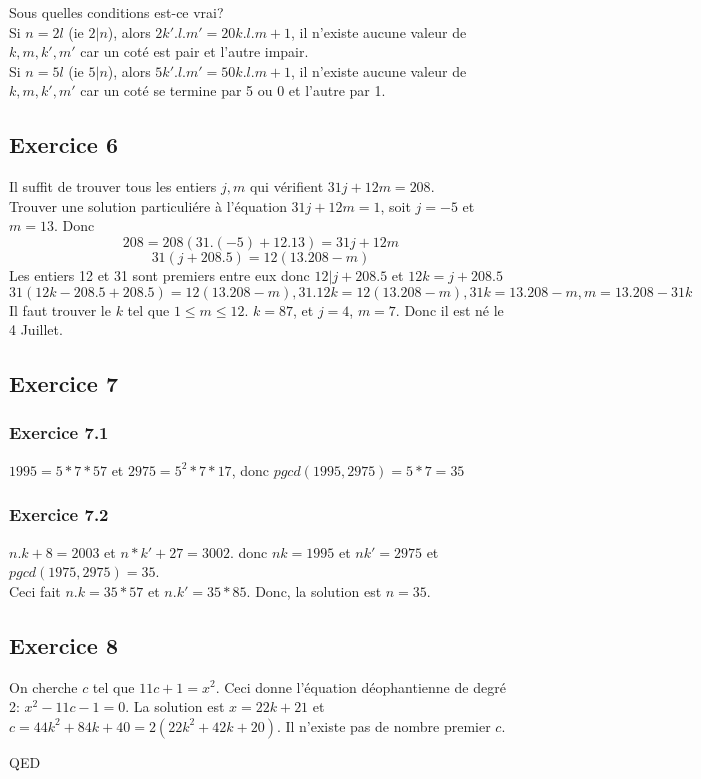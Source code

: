 \documentclass[]{book}
\theoremstyle{definition}
\begin{document}
Sous quelles conditions est-ce vrai?\\
Si $n=2l$ (ie $2|n$), alors $2k'.l.m' = 20k.l.m+1$, il n'existe aucune valeur de $k,m,k',m'$ car un cot\'e est pair et l'autre impair.\\
Si $n=5l$ (ie $5|n$), alors $5k'.l.m' = 50k.l.m+1$, il n'existe aucune valeur de $k,m,k',m'$ car un cot\'e se termine par 5 ou 0 et l'autre par 1.\\


\subsection*{Exercice 6}
Il suffit de trouver tous les entiers $j,m$ qui v\'erifient $31j+12m=208$.\\
Trouver une solution particuli\'ere \`a l'\'equation $31j+12m=1$, soit $j=-5$ et $m=13$. Donc 
$$208 = 208(31.(-5) + 12.13) =  31j + 12m$$
$$31(j+208.5) = 12(13.208-m)$$
Les entiers 12 et 31 sont premiers entre eux donc $12|j+208.5$ et $12k=j+208.5$
$$31(12k-208.5+208.5) = 12(13.208-m), 31.12k=12(13.208-m), 31k = 13.208-m, m=13.208-31k$$
Il faut trouver le $k$ tel que $1\leq m\leq 12$. $k=87$, et $j=4$, $m=7$. Donc il est n\'e le 4 Juillet.


\subsection*{Exercice 7}
\subsubsection*{Exercice 7.1}
$1995 = 5*7*57$ et $2975 = 5^2*7*17$, donc $pgcd(1995,2975) = 5*7 = 35$

\subsubsection*{Exercice 7.2}
$n.k+8 = 2003$ et $n*k' + 27 = 3002$. donc $nk=1995$ et $nk'=2975$ et $pgcd(1975,2975) = 35$.\\
Ceci fait $n.k=35*57$ et $n.k'=35*85$. Donc, la solution est $n=35$.  	
 

\subsection*{Exercice 8}
On cherche $c$ tel que $11c+1 = x^2$. Ceci donne l'\'equation d\'eophantienne de degr\'e 2: $x^2 -11c-1 = 0$.
La solution est $x=22k+21$ et $c=44k^2+84k+40=2(22k^2+42k+20)$. 
Il n'existe pas de nombre premier $c$.

QED
\end{document}
